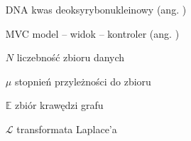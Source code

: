 \begin{itemize}
    \item[DNA] kwas deoksyrybonukleinowy (ang. )
    \item[MVC] model -- widok -- kontroler (ang. ) 
    \item[$N$] liczebność zbioru danych
    \item[$\mu$] stopnień przyleżności do zbioru
    \item[$\mathbb{E}$] zbiór krawędzi grafu
    \item[$\mathcal{L}$] transformata Laplace'a 
    \end{itemize}
